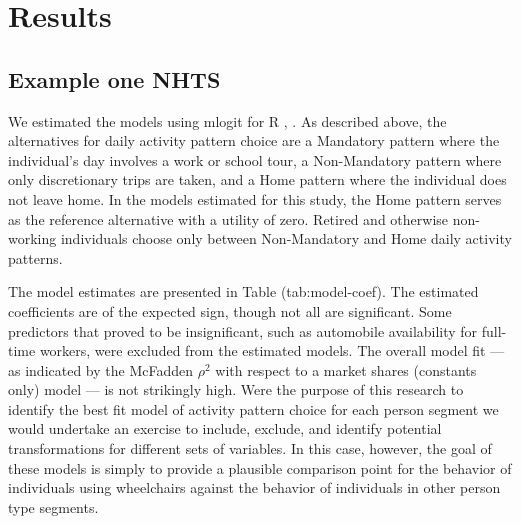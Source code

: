 \documentclass[3p, authoryear, review]{elsarticle} %
\begin{document}
\hypertarget{results}{%
\section{Results}\label{results}}

\hypertarget{example-one-nhts}{%
\subsection{Example one NHTS}\label{example-one-nhts}}

We estimated the models using mlogit for R \citet{R}, \citet{mlogit}. As described above, the
alternatives for daily activity pattern choice are a Mandatory pattern where the
individual's day involves a work or school tour, a Non-Mandatory pattern where
only discretionary trips are taken, and a Home pattern where the individual does
not leave home. In the models estimated for this study, the Home pattern serves
as the reference alternative with a utility of zero. Retired and otherwise
non-working individuals choose only between Non-Mandatory and Home daily activity
patterns.

The model estimates are presented in
Table \citet{ref}(tab:model-coef).
The estimated coefficients are of the expected sign, though not all are significant.
Some predictors that proved to be insignificant, such as automobile availability
for full-time workers, were excluded from the estimated models.
The overall model fit --- as indicated by the McFadden \(\rho^2\) with respect to
a market shares (constants only) model --- is not strikingly high. Were the purpose
of this research to identify the best fit model of activity pattern choice for
each person segment we would undertake an exercise to include, exclude, and identify
potential transformations for different sets of variables. In this case, however,
the goal of these models is simply to provide a plausible comparison point for
the behavior of individuals using wheelchairs against the behavior of individuals
in other person type segments.
\end{document}

